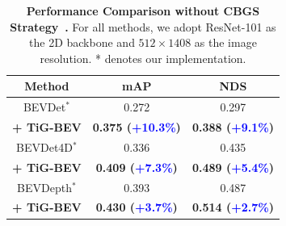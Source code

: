 \begin{table}[t!]
\centering
\caption{\textbf{Performance Comparison without CBGS Strategy~\cite{b56}.} For all methods, we adopt ResNet-101 as the 2D backbone and $512\times 1408$ as the image resolution. * denotes our implementation.}
\resizebox{1\columnwidth}{!}
{
\begin{tabular}{c|cc}
\toprule[1.2pt]
          Method& mAP&NDS  \\
          \midrule
          BEVDet$^*$& 0.272 & 0.297 \\
          \rowcolor{gray!12}\textbf{+ TiG-BEV}& \textbf{0.375 (\textcolor{blue}{+10.3\%})} &\textbf{0.388 (\textcolor{blue}{+9.1\%})} \\\midrule
          BEVDet4D$^*$& 0.336 & 0.435 \\
          \rowcolor{gray!12}\textbf{+ TiG-BEV}& \textbf{0.409 (\textcolor{blue}{+7.3\%})} &\textbf{0.489 (\textcolor{blue}{+5.4\%})} \\\midrule
          BEVDepth$^*$& 0.393 & 0.487 \\ 
          \rowcolor{gray!12}\textbf{+ TiG-BEV}& \textbf{0.430 (\textcolor{blue}{+3.7\%})} &\textbf{0.514 (\textcolor{blue}{+2.7\%})} \\
    \bottomrule[1.2pt]
    \end{tabular}}
    \label{tab:aaaa}
\end{table}
